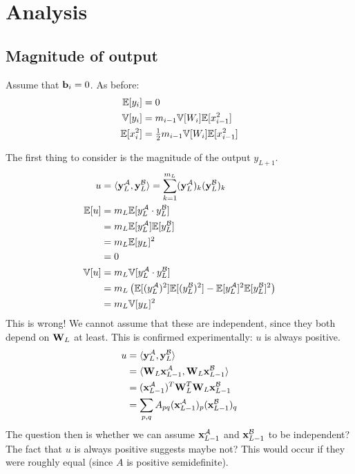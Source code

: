 \section{Analysis}

\subsection{Magnitude of output}

Assume that $\boldsymbol{\mathbf{b}}_{i} = 0$.
As before:
\begin{align}
\E[y_{i}] & = 0 \\
\V[y_{i}] & = m_{i - 1} \V[W_{i}] \E[x_{i - 1}^2] \\ %
\E[x_{i}^2] %
& = \tfrac{1}{2} m_{i - 1} \V[W_{i}] \E[x_{i - 1}^2] %
\end{align}

The first thing to consider is the magnitude of the output $y_{L+1}$.
\begin{align}
u & = \langle \boldsymbol{\mathbf{y}}_{L}^{\mathcal{A}}, \boldsymbol{\mathbf{y}}_{L}^{\mathcal{B}} \rangle
= \sum_{k = 1}^{m_{L}} (\boldsymbol{\mathbf{y}}_{L}^{\mathcal{A}})_{k} (\boldsymbol{\mathbf{y}}_{L}^{\mathcal{B}})_{k} \\
\mathbb{E}[u] & = m_{L} \mathbb{E}[y_{L}^{\mathcal{A}} \cdot y_{L}^{\mathcal{B}}] \\
& = m_{L} \mathbb{E}[y_{L}^{\mathcal{A}}] \mathbb{E}[y_{L}^{\mathcal{B}}] \\
& = m_{L} \mathbb{E}[y_{L}]^2 \\
& = 0 \\
\mathbb{V}[u] & = m_{L} \mathbb{V}[y_{L}^{\mathcal{A}} \cdot y_{L}^{\mathcal{B}}] \\
& = m_{L} \left( \mathbb{E}[(y_{L}^{\mathcal{A}})^2] \mathbb{E}[(y_{L}^{\mathcal{B}})^2] - \mathbb{E}[y_{L}^{\mathcal{A}}]^2 \mathbb{E}[y_{L}^{\mathcal{B}}]^2 \right) \\
& = m_{L} \mathbb{V}[y_{L}]^2
\end{align}
This is wrong!
We cannot assume that these are independent, since they both depend on $\boldsymbol{\mathbf{W}}_{L}$ at least.
This is confirmed experimentally: $u$ is always positive.
\begin{align}
u & = \langle \boldsymbol{\mathbf{y}}_{L}^{\mathcal{A}}, \boldsymbol{\mathbf{y}}_{L}^{\mathcal{B}} \rangle \\
& = \langle \boldsymbol{\mathbf{W}}_{L} \boldsymbol{\mathbf{x}}_{L - 1}^{\mathcal{A}}, \boldsymbol{\mathbf{W}}_{L} \boldsymbol{\mathbf{x}}_{L - 1}^{\mathcal{B}} \rangle \\
& = (\boldsymbol{\mathbf{x}}_{L - 1}^{\mathcal{A}})^{T} \boldsymbol{\mathbf{W}}_{L}^{T} \boldsymbol{\mathbf{W}}_{L} \boldsymbol{\mathbf{x}}_{L - 1}^{\mathcal{B}} \\
& = \sum_{p, q} A_{p q}  (\boldsymbol{\mathbf{x}}_{L - 1}^{\mathcal{A}})_{p} (\boldsymbol{\mathbf{x}}_{L - 1}^{\mathcal{B}})_{q}
\end{align}
The question then is whether we can assume $\boldsymbol{\mathbf{x}}_{L - 1}^{\mathcal{A}}$ and $\boldsymbol{\mathbf{x}}_{L - 1}^{\mathcal{B}}$ to be independent?
The fact that $u$ is always positive suggests maybe not?
This would occur if they were roughly equal (since $A$ is positive semidefinite).

